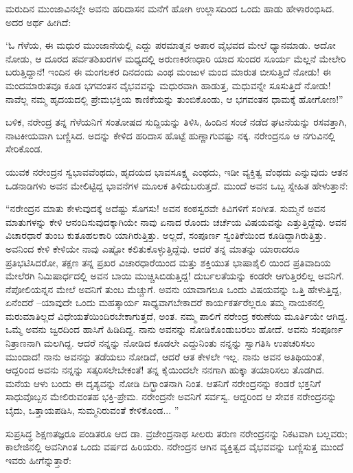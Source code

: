ಮರುದಿನ ಮುಂಜಾವಿನಲ್ಲೇ ಅವನು ಹರಿದಾಸನ ಮನೆಗೆ ಹೋಗಿ ಉಲ್ಲಾಸದಿಂದ ಒಂದು ಹಾಡು ಹೇಳಾರಂಭಿಸಿದ. ಅದರ ಅರ್ಥ ಹೀಗಿದೆ:

‘ಓ ಗೆಳೆಯ, ಈ ಮಧುರ ಮುಂಜಾನೆಯಲ್ಲಿ ಎದ್ದು ಪರಮಾತ್ಮನ ಅಪಾರ ವೈಭವದ ಮೇಲೆ ಧ್ಯಾನಮಾಡು. ಅದೋ ನೋಡು, ಆ ದೂರದ ಪರ್ವತಶಿಖರಗಳ ಮಧ್ಯದಲ್ಲಿ ಅರುಣಕಿರಣಧಾರಿ ಯಾದ ಸುಂದರ ಸೂರ್ಯ ಮೆಲ್ಲನೆ ಮೇಲೇರಿ ಬರುತ್ತಿದ್ದಾನೆ! ಇಂದಿನ ಈ ಮಂಗಲಕರ ದಿನದಂದು ಎಂಥ ಮಂಜುಳ ಮಂದ ಮಾರುತ ಬೀಸುತ್ತಿದೆ ನೋಡು! ಈ ಮಂದಮಾರುತವೂ ಕೂಡ ಭಗವಂತನ ವೈಭವವನ್ನು ಮಧುರವಾಗಿ ಹಾಡುತ್ತ, ಮಧುವನ್ನೇ ಸೂಸುತ್ತಿದೆ ನೋಡು! ನಾವೆಲ್ಲ ನಮ್ಮ ಹೃದಯದಲ್ಲಿ ಪ್ರೇಮಭಕ್ತಿಯ ಕಾಣಿಕೆಯನ್ನು ತುಂಬಿಕೊಂಡು, ಆ ಭಗವಂತನ ಧಾಮಕ್ಕೆ ಹೋಗೋಣ!”

ಬಳಿಕ, ನರೇಂದ್ರ ತನ್ನ ಗೆಳೆಯನಿಗೆ ಸಂತೋಷದ ಸುದ್ದಿಯನ್ನು ತಿಳಿಸಿ, ಹಿಂದಿನ ಸಂಜೆ ನಡೆದ ಘಟನೆಯನ್ನು ರಸವತ್ತಾಗಿ, ನಾಟಕೀಯವಾಗಿ ಬಣ್ಣಿಸಿದ. ಅದನ್ನು ಕೇಳಿದ ಹರಿದಾಸ ಹೊಟ್ಟೆ ಹುಣ್ಣಾಗುವಷ್ಟು ನಕ್ಕ. ನರೇಂದ್ರನೂ ಆ ನಗುವಿನಲ್ಲಿ ಸೇರಿಕೊಂಡ. 

ಯುವಕ ನರೇಂದ್ರನ ಸ್ವಭಾವವೆಂಥದು, ಹೃದಯದ ಭಾವಸೂಕ್ಷ್ಮ ಎಂಥದು, ಇಡೀ ವ್ಯಕ್ತಿತ್ವ ವೆಂಥದು ಎನ್ನುವುದು ಆತನ ಒಡನಾಡಿಗಳು ಅವನ ಮೇಲಿಟ್ಟಿದ್ದ ಭಾವನೆಗಳ ಮೂಲಕ ತಿಳಿದುಬರುತ್ತದೆ. ಮುಂದೆ ಅವನ ಒಬ್ಬ ಸ್ನೇಹಿತ ಹೇಳುತ್ತಾನೆ:

“ನರೇಂದ್ರನ ಮಾತು ಕೇಳುವುದಕ್ಕೆ ಅದೆಷ್ಟು ಸೊಗಸು! ಅವನ ಕಂಠಸ್ವರವೇ ಕಿವಿಗಳಿಗೆ ಸಂಗೀತ. ಸುಮ್ಮನೆ ಅವನ ಮಾತುಗಳನ್ನು ಕೇಳಿ ಆನಂದಿಸುವುದಕ್ಕಾಗಿಯೇ ನಾವು ಏನಾದ ರೊಂದು ಚರ್ಚೆಯ ವಿಷಯವನ್ನು ಎತ್ತುತ್ತಿದ್ದೆವು. ಅವನ ವಿಚಾರಧಾರೆ ತುಂಬ ಕುತೂಹಲಕಾರಿ ಯಾಗಿರುತ್ತಿತ್ತು. ಅಲ್ಲದೆ, ಸಂಪೂರ್ಣ ಸ್ವಂತಿಕೆಯಿಂದ ಕೂಡಿದ್ದಾಗಿರುತ್ತಿತ್ತು. ಅವನಿಂದ ಕೇಳಿ ಕೇಳಿಯೇ ನಾವು ಎಷ್ಟೋ ಕಲಿತುಕೊಳ್ಳುತ್ತಿದ್ದೆವು. ಆದರೆ ತನ್ನ ಮಾತನ್ನು ಯಾರಾದರೂ ಪ್ರತಿಭಟಿಸಿದರೋ, ತಕ್ಷಣ ತನ್ನ ಪ್ರಖರ ವಿಚಾರಧಾರೆಯಿಂದ ಮತ್ತು ಶಕ್ತಿಯುತ ಭಾಷಾಶೈಲಿ ಯಿಂದ ಪ್ರತಿವಾದಿಯ ಮೇಲೆರಗಿ ನಿಮಿಷಾರ್ಧದಲ್ಲಿ ಅವನ ಬಾಯಿ ಮುಚ್ಚಿಸಿಬಿಡುತ್ತಿದ್ದ! ದುರ್ಬಲತೆಯನ್ನು ಕಂಡರೇ ಆಗುತ್ತಿರಲಿಲ್ಲ ಅವನಿಗೆ. ನೆಪೋಲಿಯನ್ನನ ಮೇಲೆ ಅವನಿಗೆ ತುಂಬ ಮೆಚ್ಚುಗೆ. ಅವನು ಯಾವಾಗಲೂ ಒಂದು ವಿಷಯವನ್ನು ಒತ್ತಿ ಹೇಳುತ್ತಿದ್ದ, ಏನೆಂದರೆ –ಯಾವುದೇ ಒಂದು ಮಹತ್ಕಾರ್ಯ ಸಾಧ್ಯವಾಗಬೇಕಾದರೆ ಕಾರ್ಯಕರ್ತರೆಲ್ಲರೂ ತಮ್ಮ ನಾಯಕನಲ್ಲಿ ಮರುಮಾತಿಲ್ಲದೆ ವಿಧೇಯತೆಯಿಂದಿರಬೇಕಾಗುತ್ತದೆ, ಅಂತ. ನಮ್ಮ ಪಾಲಿಗೆ ನರೇಂದ್ರ ಕರುಣೆಯ ಮೂರ್ತಿಯೇ ಆಗಿದ್ದ. ಒಮ್ಮೆ ಅವನು ಜ್ವರದಿಂದ ಹಾಸಿಗೆ ಹಿಡಿದಿದ್ದ. ನಾನು ಅವನನ್ನು ನೋಡಿಕೊಂಡುಬರಲು ಹೋದೆ. ಅವನು ಸಂಪೂರ್ಣ ನಿತ್ರಾಣನಾಗಿ ಮಲಗಿದ್ದ. ಆದರೆ ನನ್ನನ್ನು ನೋಡಿದ ಕೂಡಲೇ ಎದ್ದುನಿಂತು ನನ್ನನ್ನು ಸ್ವಾಗತಿಸಿ ಉಪಚರಿಸಲು ಮುಂದಾದ! ನಾನು ಅವನನ್ನು ತಡೆಯಲು ನೋಡಿದೆ, ಆದರೆ ಆತ ಕೇಳಲೇ ಇಲ್ಲ. ನಾನು ಅವನ ಅತಿಥಿಯಂತೆ, ಆದ್ದರಿಂದ ಅವನು ನನ್ನನ್ನು ಸತ್ಕರಿಸಲೇಬೇಕಂತೆ! ತನ್ನ ಕೈಯಿಂದಲೇ ನನಗಾಗಿ ಹುಕ್ಕಾ ತಯಾರಿಸಲು ತೊಡಗಿದ. ಮನೆಯ ಆಳು ಬಂದು ಈ ದೃಶ್ಯವನ್ನು ನೋಡಿ ದಿಗ್ಭ್ರಾಂತನಾಗಿ ನಿಂತ. ಆತನಿಗೆ ನರೇಂದ್ರನನ್ನು ಕಂಡರೆ ಭಕ್ತನಿಗೆ ಸಾಧುವೊಬ್ಬನ ಮೇಲಿರುವಂತಹ ಭಕ್ತಿ-ಪ್ರೇಮ. ನರೇಂದ್ರನೇ ಅವನಿಗೆ ಸರ್ವಸ್ವ. ಆದ್ದರಿಂದ ಆ ಸೇವಕ ನರೇಂದ್ರನನ್ನು ಬೈದು, ಒತ್ತಾಯಪಡಿಸಿ, ಸುಮ್ಮನಿರುವಂತೆ ಕೇಳಿಕೊಂಡ... ”

ಸುಪ್ರಸಿದ್ಧ ಶಿಕ್ಷಣತಜ್ಞರೂ ಪಂಡಿತರೂ ಆದ ಡಾ. ವ್ರಜೇಂದ್ರನಾಥ ಸೀಲರು ತರುಣ ನರೇಂದ್ರನನ್ನು ನಿಕಟವಾಗಿ ಬಲ್ಲವರು; ಕಾಲೇಜಿನಲ್ಲಿ ಅವನಿಗಿಂತ ಒಂದು ವರ್ಷದ ಹಿರಿಯರು. ನರೇಂದ್ರನ ಆಗಿನ ವ್ಯಕ್ತಿತ್ವದ ವೈಭವವನ್ನು ಬಣ್ಣಿಸುತ್ತ ಮುಂದೆ ಇವರು ಹೀಗೆನ್ನುತ್ತಾರೆ:

